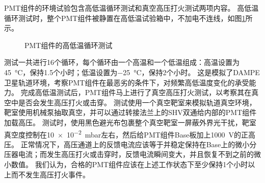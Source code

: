 PMT组件的环境试验包含高低温循环测试和真空高压打火测试两项内容。
高低温循环测试时，整个PMT组件被静置在高低温试验箱中，不加电不连线，如图\ref{fig:construction:cycling}所示。
\begin{figure}[htb]
\centering
{}
{}
\caption{PMT组件的高低温循环测试}
\label{fig:construction:cycling}
\end{figure}
测试一共进行16个循环，每个循环由一个高温和一个低温组成：高温设置为\SI{45}{\celsius}，保持1.5个小时；低温设置为\SI{-25}{\celsius}，保持2个小时。
这是模拟了DAMPE卫星轨道环境，考察PMT组件在最恶劣的条件下，对频繁高低温度变化的承受能力。
完成高低温测试后，PMT组件马上进行了真空高压打火测试，以考察其在真空中是否会发生高压打火或击穿。
测试使用一个真空靶室来模拟轨道真空环境，靶室使用机械泵抽取真空，并可以通过转接法兰上的SHV双通给内部的PMT组件加载高压。
测试时，使用黑色避光布包裹整个真空靶室一屏蔽外界光干扰，靶室真空度控制在\SI{10e-2}{mbar}左右，然后给PMT组件Base板加上\SI{1000}{V}的正高压。
正常情况下，高压通道上的反馈电流应该等于并稳定保持在Base上的微小分压器电流；而发生高压打火或击穿时，反馈电流瞬间变大，并且恢复不到之前的微小数值。
我们认为，合格的PMT组件应该在上述工作状态下至少保持1个小时以上而不发生高压打火事件。

